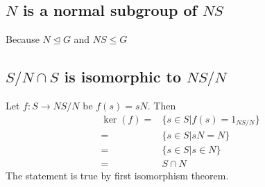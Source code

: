 \documentclass{article}
\begin{document}
	\subsection*{$N$ is a normal subgroup of $NS$ }
	Because $N\trianglelefteq G$ and $NS\leq G$
	\subsection*{$S/N\cap S$ is isomorphic to $NS/N$}
	Let $f:S\rightarrow NS/N$ be $f(s)=sN$. Then\begin{align*}
		\ker(f) =& \{s\in S|f(s)=1_{NS/N}\}\\
		=&\{s\in S|sN=N\}\\
		=&\{s\in S|s\in N\}\\
		=&S\cap N
	\end{align*}
	The statement is true by first isomorphism theorem.
\end{document}

